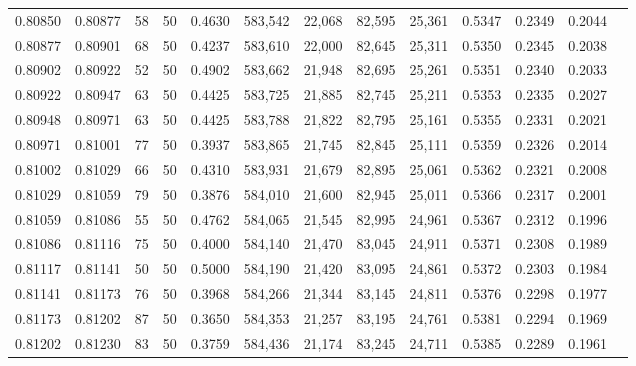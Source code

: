 \begin{tabular}{rrrrrrrrrrrrr}
0.80850 & 0.80877 &    58 &  50 &                                     0.4630 & 583,542 &  22,068 &  82,595 &  25,361 & 0.5347 & 0.2349 & 0.2044 \\
0.80877 & 0.80901 &    68 &  50 &                                     0.4237 & 583,610 &  22,000 &  82,645 &  25,311 & 0.5350 & 0.2345 & 0.2038 \\
0.80902 & 0.80922 &    52 &  50 &                                     0.4902 & 583,662 &  21,948 &  82,695 &  25,261 & 0.5351 & 0.2340 & 0.2033 \\
0.80922 & 0.80947 &    63 &  50 &                                     0.4425 & 583,725 &  21,885 &  82,745 &  25,211 & 0.5353 & 0.2335 & 0.2027 \\
0.80948 & 0.80971 &    63 &  50 &                                     0.4425 & 583,788 &  21,822 &  82,795 &  25,161 & 0.5355 & 0.2331 & 0.2021 \\
0.80971 & 0.81001 &    77 &  50 &                                     0.3937 & 583,865 &  21,745 &  82,845 &  25,111 & 0.5359 & 0.2326 & 0.2014 \\
0.81002 & 0.81029 &    66 &  50 &                                     0.4310 & 583,931 &  21,679 &  82,895 &  25,061 & 0.5362 & 0.2321 & 0.2008 \\
0.81029 & 0.81059 &    79 &  50 &                                     0.3876 & 584,010 &  21,600 &  82,945 &  25,011 & 0.5366 & 0.2317 & 0.2001 \\
0.81059 & 0.81086 &    55 &  50 &                                     0.4762 & 584,065 &  21,545 &  82,995 &  24,961 & 0.5367 & 0.2312 & 0.1996 \\
0.81086 & 0.81116 &    75 &  50 &                                     0.4000 & 584,140 &  21,470 &  83,045 &  24,911 & 0.5371 & 0.2308 & 0.1989 \\
0.81117 & 0.81141 &    50 &  50 &                                     0.5000 & 584,190 &  21,420 &  83,095 &  24,861 & 0.5372 & 0.2303 & 0.1984 \\
0.81141 & 0.81173 &    76 &  50 &                                     0.3968 & 584,266 &  21,344 &  83,145 &  24,811 & 0.5376 & 0.2298 & 0.1977 \\
0.81173 & 0.81202 &    87 &  50 &                                     0.3650 & 584,353 &  21,257 &  83,195 &  24,761 & 0.5381 & 0.2294 & 0.1969 \\
0.81202 & 0.81230 &    83 &  50 &                                     0.3759 & 584,436 &  21,174 &  83,245 &  24,711 & 0.5385 & 0.2289 & 0.1961 \\

\end{tabular}
